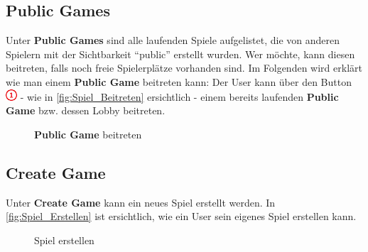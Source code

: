 \documentclass[11pt,ngerman]{article}
\newcommand{\quotes}[1]{``#1''}
\begin{document}
    \subsection{Public Games}
    \label{ssec:PublicGames}
    Unter \textbf{Public Games} sind alle laufenden Spiele aufgelistet, die von anderen Spielern mit der Sichtbarkeit \quotes{public} erstellt wurden. Wer möchte, kann diesen beitreten, falls noch freie Spielerplätze vorhanden sind. \newline
    Im Folgenden wird erklärt wie man einem \textbf{Public Game} beitreten kann: \newline
    \newline
    Der User kann über den Button \includegraphics{figures/1.png} - wie in \autoref{fig:Spiel_Beitreten} ersichtlich - einem bereits laufenden \textbf{Public Game} bzw. dessen Lobby beitreten.

    \begin{figure}[H]
    	\centering
    	\caption{\textbf{Public Game} beitreten}
    	\label{fig:Spiel_Beitreten}
    \end{figure}

    \subsection{Create Game}
    Unter \textbf{Create Game} kann ein neues Spiel erstellt werden. \newline
    \newline
    In \autoref {fig:Spiel_Erstellen} ist ersichtlich, wie ein User sein eigenes Spiel erstellen kann.

	\begin{figure}[H]
		\centering
		\caption{Spiel erstellen}
		\label{fig:Spiel_Erstellen}
	\end{figure}
\end{document}
